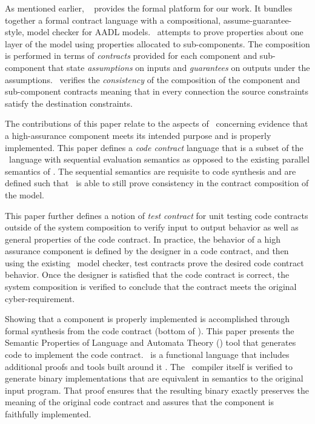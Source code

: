 As mentioned earlier,
\agr\ \cite{compositional-analysis-agree,nfm:agree} provides the
formal platform for our work. It bundles together a formal contract
language with a compositional, assume-guarantee-style, model checker
for AADL models.  \agr\ attempts to prove properties about one layer
of the model using properties allocated to sub-components.  The
composition is performed in terms of \emph{contracts} provided for
each component and sub-component that state \emph{assumptions} on
inputs and \emph{guarantees} on outputs under the assumptions.
\agr\ verifies the \emph{consistency} of the composition of the
component and sub-component contracts meaning that in every connection
the source constraints satisfy the destination constraints.

The contributions of this paper relate to the aspects of
\brfcs\ concerning evidence that a high-assurance component meets its
intended purpose and is properly implemented.  This paper defines a
\emph{code contract} language that is a subset of the \agr\ language
with sequential evaluation semantics as opposed to the existing
parallel semantics of \agr.  The sequential semantics are requisite to
code synthesis and are defined such that \agr\ is able to still prove
consistency in the contract composition of the model.

This paper further defines a notion of \emph{test contract} for unit
testing code contracts outside of the system composition to verify
input to output behavior as well as general properties of the code
contract.  In practice, the behavior of a high assurance component is
defined by the designer in a code contract, and then using the
existing \agr\ model checker, test contracts prove the desired code
contract behavior.  Once the designer is satisfied that the code
contract is correct, the system composition is verified to conclude
that the contract meets the original cyber-requirement.

Showing that a component is properly implemented is accomplished
through formal synthesis from the code contract (bottom of
).  This paper presents the Semantic Properties
of Language and Automata Theory (\splt) tool that generates
\emph{\ckml} code to implement the code contract.  \ckml\ is a
functional language that includes additional proofs and tools built
around it \cite{cakeml}.  The \ckml\ compiler itself is verified to
generate binary implementations that are equivalent in semantics to
the original input program.  That proof ensures that the resulting
binary exactly preserves the meaning of the original code contract and
assures that the component is faithfully implemented.
